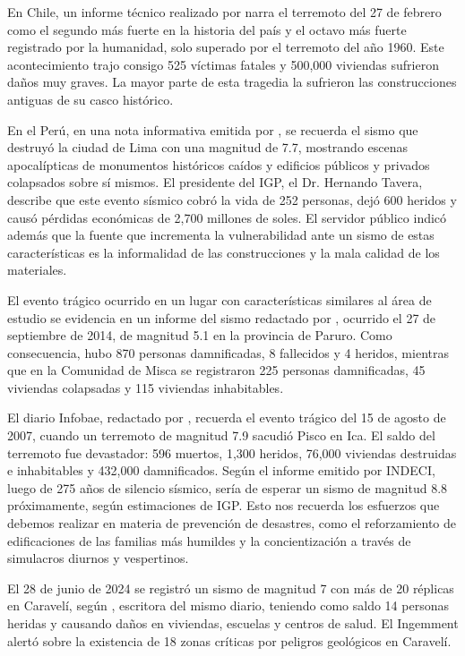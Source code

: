 En Chile, un informe técnico realizado por \cite{UGRD2010} narra el terremoto del 27 de febrero como el segundo más fuerte en la historia del país y el octavo más fuerte registrado por la humanidad, solo superado por el terremoto del año 1960. Este acontecimiento trajo consigo 525 víctimas fatales y 500,000 viviendas sufrieron daños muy graves. La mayor parte de esta tragedia la sufrieron las construcciones antiguas de su casco histórico.

En el Perú, en una nota informativa emitida por \cite{IGP2019}, se recuerda el sismo que destruyó la ciudad de Lima con una magnitud de 7.7, mostrando escenas apocalípticas de monumentos históricos caídos y edificios públicos y privados colapsados sobre sí mismos. El presidente del \ac{IGP}, el Dr. Hernando Tavera, describe que este evento sísmico cobró la vida de 252 personas, dejó 600 heridos y causó pérdidas económicas de 2,700 millones de soles. El servidor público indicó además que la fuente que incrementa la vulnerabilidad ante un sismo de estas características es la informalidad de las construcciones y la mala calidad de los materiales.

El evento trágico ocurrido en un lugar con características similares al área de estudio se evidencia en un informe del sismo redactado por \cite{INDC2014}, ocurrido el 27 de septiembre de 2014, de magnitud 5.1 en la provincia de Paruro. Como consecuencia, hubo 870 personas damnificadas, 8 fallecidos y 4 heridos, mientras que en la Comunidad de Misca se registraron 225 personas damnificadas, 45 viviendas colapsadas y 115 viviendas inhabitables.

El diario Infobae, redactado por \cite{Angulo2024}, recuerda el evento trágico del 15 de agosto de 2007, cuando un terremoto de magnitud 7.9 sacudió Pisco en Ica. El saldo del terremoto fue devastador: 596 muertos, 1,300 heridos, 76,000 viviendas destruidas e inhabitables y 432,000 damnificados. Según el informe emitido por \ac{INDECI}, luego de 275 años de silencio sísmico, sería de esperar un sismo de magnitud 8.8 próximamente, según estimaciones de \acs{IGP}. Esto nos recuerda los esfuerzos que debemos realizar en materia de prevención de desastres, como el reforzamiento de edificaciones de las familias más humildes y la concientización a través de simulacros diurnos y vespertinos.

El 28 de junio de 2024 se registró un sismo de magnitud 7 con más de 20 réplicas en Caravelí, según \cite{Leon2024}, escritora del mismo diario, teniendo como saldo 14 personas heridas y causando daños en viviendas, escuelas y centros de salud. El \ac{Ingemment} alertó sobre la existencia de 18 zonas críticas por peligros geológicos en Caravelí.

